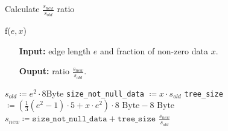 \documentclass[english, fontsize=12pt, paper=a4, twoside=false, draft=true, pagesize=auto, version=last, DIV=16]{scrartcl}
\theoremstyle{break}
\begin{document}
\begin{algorithm}
\caption{Calculate $\frac{s_{new}}{s_{old}}$ ratio}
\label{Alg f} \par
\medskip
{f($e, x$)} \par
\vspace*{-3mm}
\begin{itemize}[leftmargin=20mm]
\item[\textbf{Input:}] edge length $e$ and fraction of non-zero data $x$. \\[-20pt]
\item[\textbf{Ouput:}] ratio $\frac{s_{new}}{s_{old}}$.
\end{itemize} \par
\vspace*{-3mm}
\begin{algorithmic}[1]
	\State $s_{old} \coloneqq e^2 \cdot 8$Byte
	\State \texttt{size\_not\_null\_data} $\coloneqq x \cdot s_{old}$
	\State \texttt{tree\_size} $\coloneqq \left(\frac{1}{3}\left( e^2 - 1 \right) \cdot 5 + x \cdot e^2 \right) \cdot 8 \text{ Byte} - 8 \text{ Byte}$
	\State $s_{new} \coloneqq \texttt{size\_not\_null\_data} + \texttt{tree\_size}$ 
   	\State \Return $\frac{s_{new}}{s_{old}}$
\end{algorithmic}
\end{algorithm}\par
\vspace*{15mm}
\end{document}
